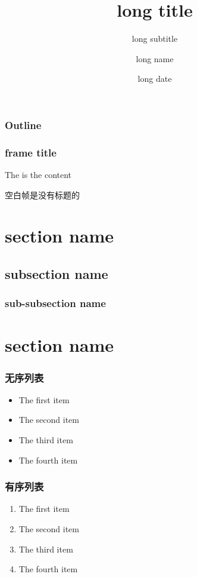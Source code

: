 \documentclass{beamer}
\title[short title]{long title}
\subtitle[short subtitle]{long subtitle}
\author[short name]{long name}
\date[short date]{long date}
\institute[short name]{long name}
\begin{document}
	
	\frame{\titlepage}

	\begin{frame}[label = outline]
		\frametitle{Outline}
		\tableofcontents
	\end{frame}

	\begin{frame}[c] %
		\frametitle{frame title}
		The is the content
		\hyperlink{outline}{}
	\end{frame}

	\begin{frame}[plain]
		空白帧是没有标题的
	\end{frame}

	
	\section{section name}
	\subsection{subsection name}
	\subsubsection{sub-subsection name}
	\section*{section name}	%
	
	
	\begin{frame}[c]
		\frametitle{无序列表}
		\begin{itemize}
			\item The first item
			\item The second item
			\item The third item
			\item The fourth item
		\end{itemize}
	\end{frame}

	\begin{frame}[c]
		\frametitle{有序列表}
		\begin{enumerate}
			\item The first item
			\item The second item
			\item The third item
			\item The fourth item
		\end{enumerate}
	\end{frame}
\end{document}
